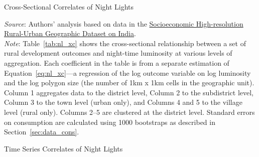 \documentclass[12pt,letterpaper]{article}
\begin{document}
\begin{appendix}
\clearpage
\begin{landscape}
\begin{table}[H]
  \caption{Cross-Sectional Correlates of Night Lights} 

  \begin{center}
  \small{}
  \end{center}
  \footnotesize{\textit{Source}: Authors' analysis based on data in the
  \href{http://www.devdatalab.org/shrug}{Socioeconomic High-resolution
    Rural-Urban Geographic Dataset on India}. \\ \textit{Note}:
  Table~\ref{tab:nl_xc} shows the cross-sectional relationship between
  a set of rural development outcomes and night-time luminosity at
  various levels of aggregation. Each coefficient in the table is from
  a separate estimation of Equation~\ref{eq:nl_xc}---a regression of
  the log outcome variable on log luminosity and the log polygon size
  (the number of 1km x 1km cells in the geographic unit). Column 1
  aggregates data to the district level, Column 2 to the subdistrict
  level, Column 3 to the town level (urban only), and Columns 4 and 5
  to the village level (rural only). Columns 2--5 are
  clustered at the district level. Standard errors on consumption are
  calculated using 1000 bootstraps as described in
  Section~\ref{sec:data_cons}.}
  \label{tab:nl_xc}
\end{table}
\end{landscape}

\begin{landscape}
\begin{table}[H]
  \caption{Time Series Correlates of Night Lights} 
  

\end{table}
\end{landscape}
\end{appendix}
\end{document}
